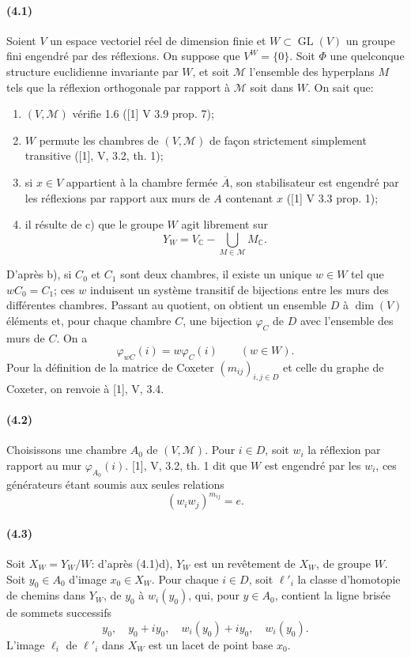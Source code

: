 \documentclass[10pt,a4paper]{article}
\newcommand{\C}{\mathbb C}
\newcommand{\GL}{\operatorname{GL}}
\begin{document}
\paragraph{(4.1)} Soient \(V\) un espace vectoriel réel de dimension finie et \(W\subset\GL(V)\) un groupe fini engendré par des réflexions. On suppose que \(V^W=\{0\}\). Soit \(\Phi\) une quelconque structure euclidienne invariante par \(W\), et soit \(\mathcal M\) l'ensemble des hyperplans \(M\) tels que la réflexion orthogonale par rapport à \(\mathcal M\) soit dans \(W\). On sait que:
\begin{enumerate}[label=\alph*)]
\item \((V,\mathcal M)\) vérifie 1.6 ([1] V 3.9 prop. 7);
\item \(W\) permute les chambres de \((V,\mathcal M)\) de façon strictement simplement transitive ([1], V, 3.2, th. 1);
\item si \(x\in V\) appartient à la chambre fermée \(\overline A\), son stabilisateur est engendré par les réflexions par rapport aux murs de \(A\) contenant \(x\) ([1] V 3.3 prop. 1);
\item il résulte de c) que le groupe \(W\) agit librement sur
\[
Y_W=V_\C-\bigcup_{M\in\mathcal M}M_\C.
\]
\end{enumerate}
D'après b), si \(C_0\) et \(C_1\) sont deux chambres, il existe un unique \(w\in W\) tel que \(wC_0=C_1\); ces \(w\) induisent un système transitif de bijections entre les murs des différentes chambres. Passant au quotient, on obtient un ensemble \(D\) à \(\dim(V)\) éléments et, pour chaque chambre \(C\), une bijection \(\varphi_C\) de \(D\) avec l'ensemble des murs de \(C\). On a
\[
\tag{4.1.1}
\varphi_{wC}(i)=w\varphi_C(i)\qquad(w\in W).
\]
Pour la définition de la matrice de Coxeter \((m_{ij})_{i,j\in D}\) et celle du graphe de Coxeter, on renvoie à [1], V, 3.4.

\paragraph{(4.2)} Choisissons une chambre \(A_0\) de \((V,\mathcal M)\). Pour \(i\in D\), soit \(w_i\) la réflexion par rapport au mur \(\varphi_{A_0}(i)\). [1], V, 3.2, th. 1 dit que \(W\) est engendré par les \(w_i\), ces générateurs étant soumis aux seules relations
\[
(w_iw_j)^{m_{ij}}=e.
\]

\paragraph{(4.3)} Soit \(X_W=Y_W/W\): d'après (4.1)d), \(Y_W\) est un revêtement de \(X_W\), de groupe \(W\). Soit \(y_0\in A_0\) d'image \(x_0\in X_W\). Pour chaque \(i\in D\), soit \(\ell'_i\) la classe d'homotopie de chemins dans \(Y_W\), de \(y_0\) à \(w_i(y_0)\), qui, pour \(y\in A_0\), contient la ligne brisée de sommets successifs
\[
y_0,\quad y_0+iy_0,\quad w_i(y_0)+iy_0,\quad w_i(y_0).
\]
L'image \(\ell_i\) de \(\ell'_i\) dans \(X_W\) est un lacet de point base \(x_0\).
\end{document}
